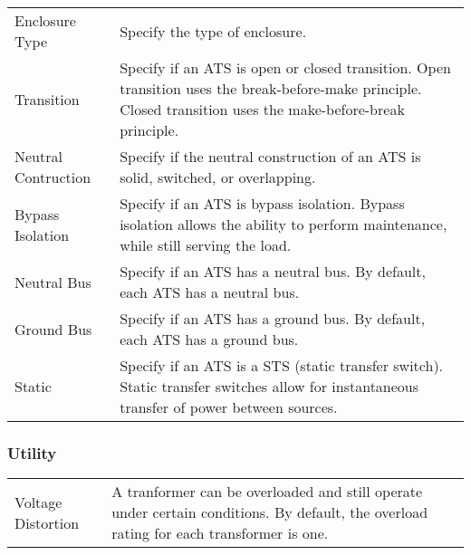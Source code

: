 \documentclass[letterpaper,10pt,english]{sphinxmanual}
\begin{document}
\begin{savenotes}\sphinxattablestart
\centering
\begin{tabulary}{\linewidth}[t]{|T|T|}
\hline
\sphinxstyletheadfamily 
{}
&\sphinxstyletheadfamily 
{}
\\
\hline
Enclosure Type
&
Specify the type of enclosure.
\\
\hline
Transition
&
Specify if an ATS is open or closed transition.  Open transition uses the break-before-make principle.  Closed transition uses the make-before-break principle.
\\
\hline
Neutral Contruction
&
Specify if the neutral construction of an ATS is solid, switched, or overlapping.
\\
\hline
Bypass Isolation
&
Specify if an ATS is bypass isolation. Bypass isolation allows the ability to perform maintenance, while still serving the load.
\\
\hline
Neutral Bus
&
Specify if an ATS has a neutral bus.  By default, each ATS has a neutral bus.
\\
\hline
Ground Bus
&
Specify if an ATS has a ground bus.  By default, each ATS has a ground bus.
\\
\hline
Static
&
Specify if an ATS is a STS (static transfer switch).  Static transfer switches allow for instantaneous transfer of power between sources.
\\
\hline
\end{tabulary}
\par
\sphinxattableend\end{savenotes}


\subsubsection{Utility}
\label{\detokenize{docs/definitions/index-definitions:utility}}

\begin{savenotes}\sphinxattablestart
\centering
\begin{tabulary}{\linewidth}[t]{|T|T|}
\hline
\sphinxstyletheadfamily 
{}
&\sphinxstyletheadfamily 
{}
\\
\hline
Voltage Distortion
&
A tranformer can be overloaded and still operate under certain conditions. By default, the overload rating for each transformer is one.
\\
\hline
\end{tabulary}
\par
\sphinxattableend\end{savenotes}
\end{document}
